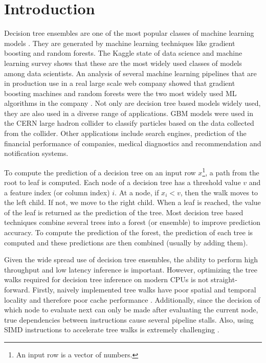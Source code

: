 \section{Introduction}
Decision tree ensembles are one of the most popular classes of machine learning models \cite{KaggleSurvey,LookingGlass}.
They are generated by machine learning techniques like gradient boosting and random forests. 
The Kaggle state of data science and machine learning survey \cite{KaggleSurvey} shows that 
these are the most widely used classes of models among data scientists. An analysis of 
several machine learning pipelines that are in production use in a real large scale web company showed that 
gradient boosting machines and random forests were the two most widely used ML algorithms in the company \cite{LookingGlass}.
Not only are decision tree based models widely used, they are also used in a diverse range of 
applications\cite{DecisionTreesOverview}. GBM models were used in the CERN large hadron collider
to classify particles based on the data collected from the collider\cite{LHCModel}. Other applications 
include search engines\cite{YahooSearch}, prediction of the financial performance of companies\cite{Finance},
medical diagnostics\cite{Med1, Med2} and recommendation and notification systems\cite{Facebook}.

To compute the prediction of a decision tree on an input row $x$\footnote{An input row is a
vector of numbers.}, a path from the root to leaf is computed.
Each node of a decision tree has a threshold value $v$ and a feature index (or column index) $i$.
At a node, if $x_i < v$, then 
the walk moves to the left child. If not, we move to the right child. When a leaf is reached, 
the value of the leaf is returned as the prediction of the tree. 
Most decision tree based techniques combine several trees into a forest (or ensemble) to improve prediction accuracy.
To compute the prediction of the forest, the prediction of each tree is computed and these predictions are 
then combined (usually by adding them). 

Given the wide spread use of decision tree ensembles, the ability to perform high throughput and low latency inference is important.
However, optimizing the tree walks required for decision tree inference on modern CPUs is not straight-forward. 
Firstly, naively implemented tree walks have poor spatial and temporal locality and therefore poor cache performance \cite{FAST,MilindTreeVectorization}.
Additionally, since the decision of which node to evaluate next can only be made after evaluating the current node,
true dependencies between instructions cause several pipeline stalls. Also, using SIMD instructions to accelerate 
tree walks is extremely challenging \cite{MilindTreeVectorization}.

